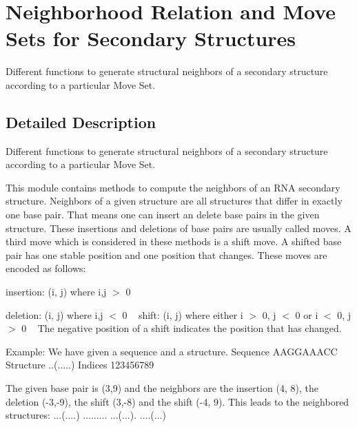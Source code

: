 \hypertarget{group__neighbors}{}\section{Neighborhood Relation and Move Sets for Secondary Structures}
\label{group__neighbors}


Different functions to generate structural neighbors of a secondary structure according to a particular Move Set.  




\subsection{Detailed Description}
Different functions to generate structural neighbors of a secondary structure according to a particular Move Set. 

This module contains methods to compute the neighbors of an R\+NA secondary structure. Neighbors of a given structure are all structures that differ in exactly one base pair. That means one can insert an delete base pairs in the given structure. These insertions and deletions of base pairs are usually called moves. A third move which is considered in these methods is a shift move. A shifted base pair has one stable position and one position that changes. These moves are encoded as follows\+: ~\newline

\begin{DoxyItemize}
\item insertion\+: (i, j) where i,j $>$ 0 ~\newline

\item deletion\+: (i, j) where i,j $<$ 0 ~\newline
 shift\+: (i, j) where either i $>$ 0, j $<$ 0 or i $<$ 0, j $>$ 0 ~\newline
 The negative position of a shift indicates the position that has changed.
\end{DoxyItemize}


\begin{DoxyCode}
Example:
         We have given a sequence and a structure.
         Sequence  AAGGAAACC
         Structure ..(.....)
         Indices   123456789

         The given base pair is (3,9) and the neighbors are the insertion (4, 8), the deletion (-3,-9), the
       shift (3,-8)
         and the shift (-4, 9).
         This leads to the neighbored structures:
         ...(....)
         .........
         ...(...).
         ....(...)
\end{DoxyCode}


